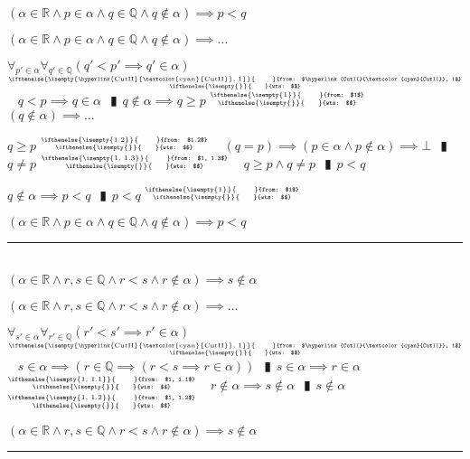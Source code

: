 \documentclass{book}
\newcommand{\wff}[1]{\hypertarget{#1}{\fbox{\textcolor{red}{$#1$}}\phantom{--}}}
\newcommand{\rf}[1]{\hyperlink{#1}{\textcolor{cyan}{#1}}}
\newcommand{\pipe}{$\phantom{(}\vrectangleblack\phantom{)}$}
\newcommand{\pr}[1]{\left(#1\right)}
\newcommand{\ann}[2]{%
  \hfill %
  $\stackrel%
  {\hbox{\tiny{\ifthenelse{\isempty{#1}}%
    {\phantom{from}}%
    {from: $#1$}}}}%
  {\hbox{\tiny{\ifthenelse{\isempty{#2}}%
    {\phantom{wts}}%
    {wts: $#2$}}}}$%
\ }
\begin{document}
\wff{CutCorollaryI} $(\alpha \in \mathbb{R} \land p \in \alpha \land q \in \mathbb{Q} \land q \notin \alpha) \implies p < q$
\begin{enumerate}
  \lit $(\alpha \in \mathbb{R} \land p \in \alpha \land q \in \mathbb{Q} \land q \notin \alpha) \implies \ldots$
  \begin{enumerate}
    \lit $\forall_{p' \in \alpha} \forall_{q' \in \mathbb{Q}}(q' < p' \implies q' \in \alpha)$    \ann{\rf{CutII}, 1}{}
    \lit $q < p \implies q \in \alpha$ \pipe $q \notin \alpha \implies q \geq p$    \ann{1}{}
    \lit $(q \notin \alpha) \implies \ldots$
    \begin{enumerate}
      \lit $q \geq p$    \ann{1.2}{}
      \lit $(q = p) \implies (p \in \alpha \land p \notin \alpha) \implies \bot$ \pipe $q \neq p$    \ann{1, 1.3}{}
      \lit $q \geq p \land q \neq p$ \pipe $p < q$
    \end{enumerate}
    \lit $q \notin \alpha \implies p < q$ \pipe $p < q$    \ann{1}{}
  \end{enumerate}
  \lit $(\alpha \in \mathbb{R} \land p \in \alpha \land q \in \mathbb{Q} \land q \notin \alpha) \implies p < q$
\end{enumerate} \vspace{.75mm} \hrule \vspace{.75mm} \ \\

\wff{CutCorollaryII} $(\alpha \in \mathbb{R} \land r, s \in \mathbb{Q} \land r < s \land r \notin \alpha) \implies s \notin \alpha$
\begin{enumerate}
  \lit $(\alpha \in \mathbb{R} \land r, s \in \mathbb{Q} \land r < s \land r \notin \alpha) \implies \ldots$
  \begin{enumerate}
    \lit $\forall_{s' \in \alpha} \forall_{r' \in \mathbb{Q}}(r' < s' \implies r' \in \alpha)$    \ann{\rf{CutII}, 1}{}
    \lit $s \in \alpha \implies \pr{r \in \mathbb{Q} \implies \pr{r < s \implies r \in \alpha}}$ \pipe $s \in \alpha \implies r \in \alpha$    \ann{1, 1.1}{}
    \lit $r \notin \alpha \implies s \notin \alpha$ \pipe $s \notin \alpha$    \ann{1, 1.2}{}
  \end{enumerate}
  \lit $(\alpha \in \mathbb{R} \land r, s \in \mathbb{Q} \land r < s \land r \notin \alpha) \implies s \notin \alpha$
\end{enumerate} \vspace{.75mm} \hrule \vspace{.75mm} \ \\
\end{document}
